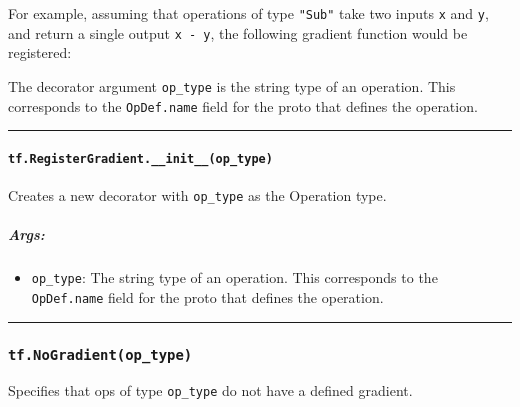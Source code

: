 For example, assuming that operations of type \lstinline{"Sub"} take two
inputs \lstinline{x} and \lstinline{y}, and return a single output
\lstinline{x - y}, the following gradient function would be registered:

\begin{Shaded}
\begin{Highlighting}[]
\NormalTok{(}\NormalTok{)}
 
   
\end{Highlighting}
\end{Shaded}

The decorator argument \lstinline{op_type} is the string type of an
operation. This corresponds to the \lstinline{OpDef.name} field for the
proto that defines the operation.

\begin{center}\rule{0.5\linewidth}{\linethickness}\end{center}

\paragraph{\texorpdfstring{\lstinline{tf.RegisterGradient.__init__(op_type)}
}{tf.RegisterGradient.__init__(op_type) }}\label{tf.registergradient.ux5fux5finitux5fux5fopux5ftype}

Creates a new decorator with \lstinline{op_type} as the Operation type.

\subparagraph{Args: }\label{args-28}

\begin{itemize}
\tightlist
\item
  \lstinline{op_type}: The string type of an operation. This corresponds
  to the \lstinline{OpDef.name} field for the proto that defines the
  operation.
\end{itemize}

\begin{center}\rule{0.5\linewidth}{\linethickness}\end{center}

\subsubsection{\texorpdfstring{\lstinline{tf.NoGradient(op_type)}
}{tf.NoGradient(op_type) }}\label{tf.nogradientopux5ftype}

Specifies that ops of type \lstinline{op_type} do not have a defined
gradient.

